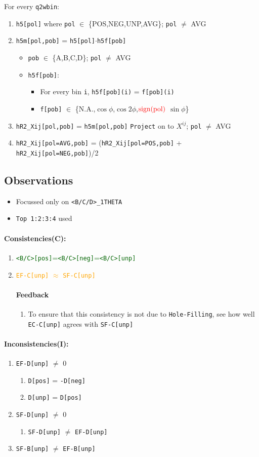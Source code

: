 \documentclass{article}
\newcommand{\code}[1]{\texttt{#1}}
\newcommand{\bi}{\begin{itemize}}
\newcommand{\ei}{\end{itemize}}
\newcommand{\be}{\begin{enumerate}}
\newcommand{\ee}{\end{enumerate}}
\newcommand{\atgr}[1]{\textcolor{darkgreen}{#1}}
\newcommand{\ator}[1]{\textcolor{orange}{#1}}
\numberwithin{equation}{subsection}
\begin{document}
For every \code{q2wbin}:
\begin{enumerate}
	\item \code{h5[pol]} where \code{pol} $\in$ \{POS,NEG,UNP,AVG\}; \code{pol} $\neq$ AVG
	\item \code{h5m[pol,pob]} = \code{h5[pol]}$\cdot$\code{h5f[pob]} 
		\begin{itemize}
		\item \code{pob} $\in$ \{A,B,C,D\}; \code{pol} $\neq$ AVG
		\item \code{h5f[pob]}:
			\begin{itemize}
			\item For every bin \code{i}, \code{h5f[pob](i)} = \code{f[pob](i)}
			\item \code{f[pob]} $\in$ \{N.A.,$\cos\phi$,$\cos 2\phi$,$\color{red}{\text{sign(pol)}}$ $\sin\phi$\}
			\end{itemize}
		\end{itemize}
	\item \code{hR2\_Xij[pol,pob]} = \code{h5m[pol,pob]} \code{Project} on to $X^{ij}$; \code{pol} $\neq$ AVG
	\item \code{hR2\_Xij[pol=AVG,pob]} = (\code{hR2\_Xij[pol=POS,pob]} + \code{hR2\_Xij[pol=NEG,pob]})/2
\end{enumerate}

\subsection{Observations}
\bi
	\item Focussed only on \code{<B/C/D>\_1THETA}
	\item \code{Top 1:2:3:4} used
\ei

\paragraph{\textbf{Consistencies(C)}:}
\be
	\item \atgr{\code{<B/C>[pos]}=\code{<B/C>[neg]}=\code{<B/C>[unp]}}
	\item \ator{\code{EF-C[unp]} $\approx$ \code{SF-C[unp]}}
		\paragraph{Feedback}
		\be
			\item To ensure that this consistency is not due to \code{Hole-Filling}, see how well \code{EC-C[unp]} agrees with \code{SF-C[unp]}
		\ee
\ee

\paragraph{\textbf{Inconsistencies(I)}:}
\be
   	\item \code{EF-D[unp]} $\neq$ 0
   	\be
   		\item \code{D[pos]} = \code{-D[neg]}
   		\item \code{D[unp]} = \code{D[pos]}
   	\ee
   	\item \code{SF-D[unp]} $\neq$ 0
   	\be
   		\item \code{SF-D[unp]} $\neq$ \code{EF-D[unp]}
   	\ee
   	\item \code{SF-B[unp]} $\neq$ \code{EF-B[unp]}
\ee
\end{document}
